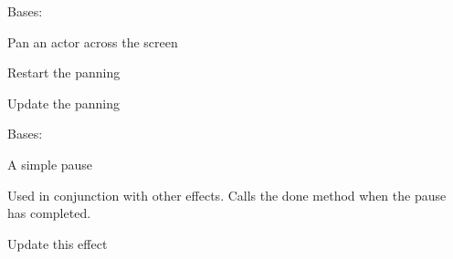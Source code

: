 \documentclass[letterpaper,10pt,english]{sphinxmanual}
\begin{document}
\begin{fulllineitems}
\label{blocks:serge.blocks.effects.PanActor}
Bases: {\hyperref[blocks:serge.blocks.effects.Effect]{}}

Pan an actor across the screen

\begin{fulllineitems}
\label{blocks:serge.blocks.effects.PanActor.restart}
Restart the panning

\end{fulllineitems}


\begin{fulllineitems}
\label{blocks:serge.blocks.effects.PanActor.updateActor}
Update the panning

\end{fulllineitems}


\end{fulllineitems}


\begin{fulllineitems}
\label{blocks:serge.blocks.effects.Pause}
Bases: {\hyperref[blocks:serge.blocks.effects.Effect]{}}

A simple pause

Used in conjunction with other effects. Calls the done method when
the pause has completed.

\begin{fulllineitems}
\label{blocks:serge.blocks.effects.Pause.updateActor}
Update this effect

\end{fulllineitems}


\end{fulllineitems}
\end{document}
